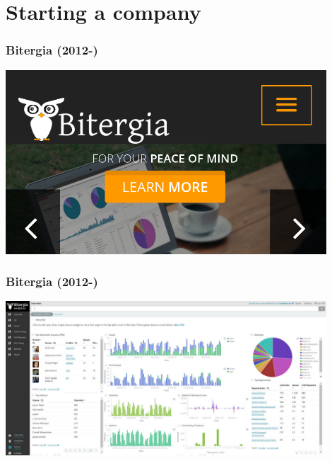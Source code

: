 \documentclass[17pt,aspectratio=169,hyperref=pdfusetitle]{beamer}
\begin{document}
\section{Starting a company}

\begin{frame}[fragile]
  \frametitle{Bitergia (2012-)}

  \begin{center}
  \includegraphics[width=12cm]{figs/bitergia}
  \end{center}  
  
\end{frame}

\begin{frame}[fragile]
  \frametitle{Bitergia (2012-)}

  \begin{center}
  \includegraphics[width=12cm]{figs/bitergia-dashboard}
  \end{center}  
  
\end{frame}
\end{document}
